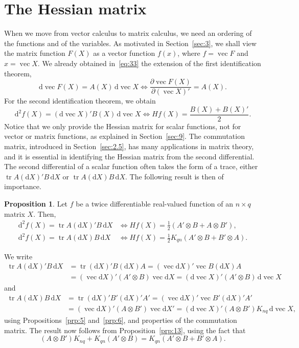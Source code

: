 \documentclass[12pt,a4paper]{article}
\makeatletter
\theoremstyle{definition}
\newtheorem{proposition}{Proposition}
\renewenvironment{proof}[1][\proofname]{\par
  \pushQED{\qed}%
  \normalfont \topsep6\p@\@plus6\p@\relax
  \trivlist
  \item[\hskip\labelsep\bfseries #1\@addpunct{.}]\ignorespaces
}{%
  \popQED\endtrivlist\@endpefalse
}
\DeclareMathOperator{\tr}{tr}
\DeclareMathOperator{\avec}{vec}
\newcommand{\dd}{\mathrm{d}}
\makeatother
\begin{document}
\section{The Hessian matrix}\label{sec:11}

When we move from vector calculus to matrix calculus, we need an ordering of the functions and of the variables. As motivated in Section~\ref{sec:3}, we shall view the matrix function $F(X)$ as a vector function $f(x)$, where $f = \avec F$ and $x = \avec X$. We already obtained in~\eqref{eq:33} the extension of the first identification theorem,
\[
\dd\avec F(X) = A(X)\, \dd\avec X \iff \frac{\partial \avec F(X)}{\partial(\avec X)'} = A(X).
\]
For the second identification theorem, we obtain
\begin{equation}\label{eq:42}
\dd^2 f(X) = (\dd\avec X)' B(X)\, \dd\avec X \iff Hf(X) = \frac{B(X) + B(X)'}{2}.
\end{equation}
Notice that we only provide the Hessian matrix for scalar functions, not for vector or matrix functions, as explained in Section~\ref{sec:9}. %
The commutation matrix, introduced in Section~\ref{sec:2.5}, has many applications in matrix theory, and it is essential in identifying the Hessian matrix from the second differential. The second differential of a scalar function often takes the form of a trace, either $\tr A(\dd X)'B\, \dd X$ or $\tr A(\dd X)B\, \dd X$. The following result is then of importance. %

\begin{proposition}\label{prp:15}
Let $f$ be a twice differentiable real-valued function of an $n \times q$ matrix $X$. Then,
\begin{align*}
\dd^2 f(X) = \tr A(\dd X)'B\, \dd X &\iff Hf(X) = \tfrac{1}{2}(A' \otimes B + A \otimes B'), \\
\dd^2 f(X) = \tr A(\dd X)B\, \dd X &\iff Hf(X) = \tfrac{1}{2} K_{qn}(A' \otimes B + B' \otimes A).
\end{align*}
\end{proposition}

\begin{proof}
We write
\begin{align*}
\tr A(\dd X)'B\, \dd X &= \tr(\dd X)'B(\dd X)A = (\avec \dd X)' \avec B(\dd X)A \\
&= (\avec \dd X)'(A' \otimes B) \avec \dd X = (\dd\avec X)'(A' \otimes B)\, \dd\avec X
\end{align*}
and
\begin{align*}
\tr A(\dd X)B\, \dd X &= \tr(\dd X)'B'(\dd X)'A' = (\avec \dd X)' \avec B'(\dd X)'A' \\
&= (\avec \dd X)'(A \otimes B') \avec \dd X' = (\dd\avec X)'(A \otimes B') K_{nq}\, \dd\avec X,
\end{align*}
using Propositions~\ref{prp:5} and~\ref{prp:6}, and properties of the commutation matrix. The result now follows from Proposition~\ref{prp:13}, using the fact that
\[
(A \otimes B') K_{nq} + K_{qn}(A' \otimes B) = K_{qn}(A' \otimes B + B' \otimes A).
\]
\end{proof}
\end{document}
